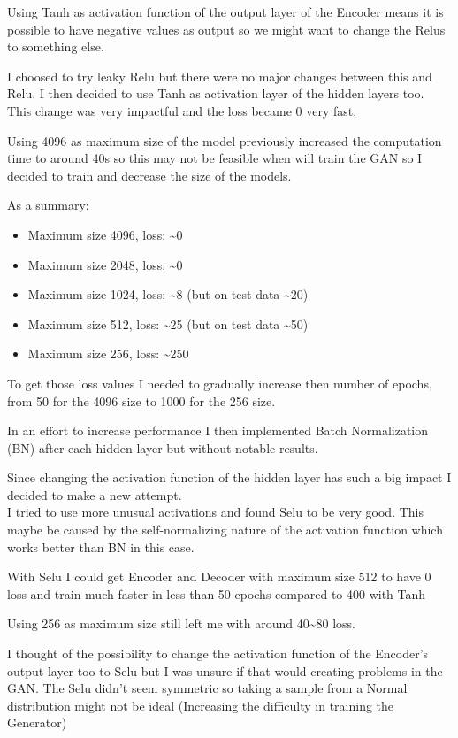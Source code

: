 \documentclass[
  letterpaper,
  DIV=11,
  numbers=noendperiod]{scrreprt}
\providecommand{\tightlist}{%
  \setlength{\itemsep}{0pt}\setlength{\parskip}{0pt}}\usepackage{longtable,booktabs,array}
\begin{document}
Using Tanh as activation function of the output layer of the Encoder
means it is possible to have negative values as output so we might want
to change the Relus to something else.

I choosed to try leaky Relu but there were no major changes between this
and Relu. I then decided to use Tanh as activation layer of the hidden
layers too.\\
This change was very impactful and the loss became 0 very fast.

Using 4096 as maximum size of the model previously increased the
computation time to around 40s so this may not be feasible when will
train the GAN so I decided to train and decrease the size of the models.

As a summary:

\begin{itemize}
\tightlist
\item
  Maximum size 4096, loss: \textasciitilde0
\item
  Maximum size 2048, loss: \textasciitilde0
\item
  Maximum size 1024, loss: \textasciitilde8 (but on test data
  \textasciitilde20)
\item
  Maximum size 512, loss: \textasciitilde25 (but on test data
  \textasciitilde50)
\item
  Maximum size 256, loss: \textasciitilde250
\end{itemize}

To get those loss values I needed to gradually increase then number of
epochs, from 50 for the 4096 size to 1000 for the 256 size.

In an effort to increase performance I then implemented Batch
Normalization (BN) after each hidden layer but without notable results.

Since changing the activation function of the hidden layer has such a
big impact I decided to make a new attempt.\\
I tried to use more unusual activations and found Selu to be very good.
This maybe be caused by the self-normalizing nature of the activation
function which works better than BN in this case.

With Selu I could get Encoder and Decoder with maximum size 512 to have
0 loss and train much faster in less than 50 epochs compared to 400 with
Tanh

Using 256 as maximum size still left me with around 40\textasciitilde80
loss.

I thought of the possibility to change the activation function of the
Encoder's output layer too to Selu but I was unsure if that would
creating problems in the GAN. The Selu didn't seem symmetric so taking a
sample from a Normal distribution might not be ideal (Increasing the
difficulty in training the Generator)
\end{document}

